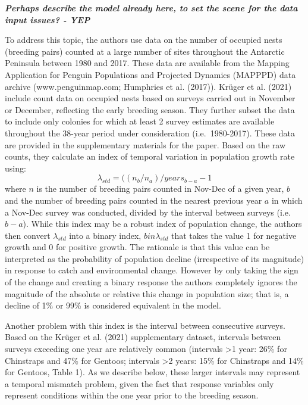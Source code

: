 \documentclass[]{elsarticle} %
\begin{document}
\textbf{\emph{Perhaps describe the model already here, to set the scene
for the data input issues? - YEP}}

To address this topic, the authors use data on the number of occupied
nests (breeding pairs) counted at a large number of sites throughout the
Antarctic Peninsula between 1980 and 2017. These data are available from
the Mapping Application for Penguin Populations and Projected Dynamics
(MAPPPD) data archive (www.penguinmap.com; Humphries et al. (2017)).
Krüger et al. (2021) include count data on occupied nests based on
surveys carried out in November or December, reflecting the early
breeding season. They further subset the data to include only colonies
for which at least 2 survey estimates are available throughout the
38-year period under consideration (i.e.~1980-2017). These data are
provided in the supplementary materials for the paper. Based on the raw
counts, they calculate an index of temporal variation in population
growth rate using: \[\lambda_{std}=((n_b/n_a)/years_{b-a}-1\] where
\(n\) is the number of breeding pairs counted in Nov-Dec of a given
year, \(b\) and the number of breeding pairs counted in the nearest
previous year \(a\) in which a Nov-Dec survey was conducted, divided by
the interval between surveys (i.e.~\(b-a\)). While this index may be a
robust index of population change, the authors then convert
\(\lambda_{std}\) into a binary index, \(bin\lambda_{std}\) that takes
the value 1 for negative growth and 0 for positive growth. The rationale
is that this value can be interpreted as the probability of population
decline (irrespective of its magnitude) in response to catch and
environmental change. However by only taking the sign of the change and
creating a binary response the authors completely ignores the magnitude
of the absolute or relative this change in population size; that is, a
decline of 1\% or 99\% is considered equivalent in the model.

Another problem with this index is the interval between consecutive
surveys. Based on the Krüger et al. (2021) supplementary dataset,
intervals between surveys exceeding one year are relatively common
(intervals \textgreater1 year: 26\% for Chinstraps and 47\% for Gentoos;
intervals \textgreater2 years: 15\% for Chinstraps and 14\% for Gentoos,
Table 1). As we describe below, these larger intervals may represent a
temporal mismatch problem, given the fact that response variables only
represent conditions within the one year prior to the breeding season.
\end{document}

